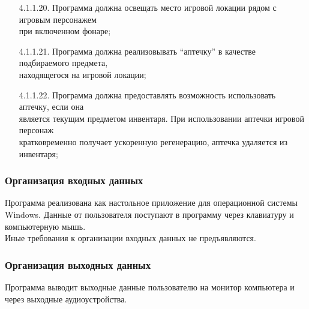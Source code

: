 \begin{enumerate}
    \item[4.1.1.20.] Программа должна освещать место игровой локации рядом с игровым персонажем\\
    при включенном фонаре;
    \item[4.1.1.21.] Программа должна реализовывать ``аптечку'' в качестве подбираемого предмета,\\
    находящегося на игровой локации;
    \item[4.1.1.22.] Программа должна предоставлять возможность использовать аптечку, если она\\является текущим предметом инвентаря. При использовании аптечки игровой персонаж\\
    кратковременно получает ускоренную регенерацию, аптечка удаляется из инвентаря;
\end{enumerate}

\subsubsection{Организация входных данных}

Программа реализована как настольное приложение для операционной системы Windows. Данные от пользователя поступают в программу через клавиатуру и компьютерную мышь. \\
Иные требования к организации входных данных не предъявляются. 

\subsubsection{Организация выходных данных}

Программа выводит выходные данные пользователю на монитор компьютера и через выходные аудиоустройства.
